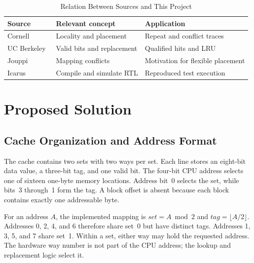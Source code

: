 \documentclass[conference]{IEEEtran}
\begin{document}
\begin{table}[!t]
\caption{Relation Between Sources and This Project}
\label{tab:sources}
\centering
\begin{tabular}{p{}p{}p{}}
\toprule
Source & Relevant concept & Application \\
\midrule
Cornell~\cite{cornell} & Locality and placement & Repeat and conflict traces \\
UC Berkeley~\cite{berkeley} & Valid bits and replacement & Qualified hits and LRU \\
Jouppi~\cite{jouppi} & Mapping conflicts & Motivation for flexible placement \\
Icarus~\cite{icarus} & Compile and simulate RTL & Reproduced test execution \\
\bottomrule
\end{tabular}
\end{table}

\section{Proposed Solution}

\subsection{Cache Organization and Address Format}

The cache contains two sets with two ways per set. Each line stores an
eight-bit data value, a three-bit tag, and one valid bit. The four-bit
CPU address selects one of sixteen one-byte memory locations. Address
bit~0 selects the set, while bits~3 through~1 form the tag. A block
offset is absent because each block contains exactly one addressable
byte.

For an address $A$, the implemented mapping is
$\mathit{set} = A \bmod 2$ and $\mathit{tag} = \lfloor A/2 \rfloor$.
Addresses 0, 2, 4, and 6 therefore share set~0 but have distinct tags.
Addresses 1, 3, 5, and 7 share set~1. Within a set, either way may hold
the requested address. The hardware way number is not part of the CPU
address; the lookup and replacement logic select it.
\end{document}
